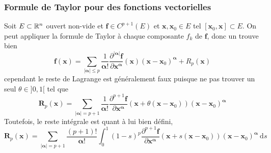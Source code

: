 \subsubsection{Formule de Taylor pour des fonctions vectorielles}
Soit $E \subset \mathbb R^n$ ouvert non-vide et $\bm f \in C^{p+1}(E)$ et $\bm x, \bm x_0 \in E$ tel $[\bm x_0, \bm x] \subset E$. On peut appliquer la formule de Taylor à chaque composante $f_k$ de $\bm f$, donc un trouve bien
\[
\bm f(\bm x) = \sum_{|\bm \alpha| \leqslant p} \frac{1}{\bm \alpha !} \frac{\partial^{|\bm \alpha|} \bm f}{\partial \bm x^{\bm \alpha}}(\bm x) (\bm x - \bm x_0)^{\bm \alpha} + R_p(\bm x)
\]
cependant le reste de Lagrange est généralement faux puisque ne pas trouver un seul $\theta \in ]0,1[$ tel que
\[
\bm R_p(\bm x) = \sum_{|\bm \alpha| = p + 1} \frac{1}{\bm \alpha !} \frac{\partial^{p+1} \bm f}{\partial \bm x^{\bm \alpha}} (\bm x + \theta (\bm x - \bm x_0))(\bm x - \bm x_0)^{\bm \alpha}
\]
Toutefois, le reste intégrale est quant à lui bien défini,
\[
\bm R_p(\bm x) = \sum_{|\bm \alpha| = p + 1} \frac{(p+1)!}{\bm \alpha!} \int_0^1 (1-s)^p \frac{\partial^{p+1} \bm f}{\partial \bm x^{\bm \alpha}} (\bm x + s (\bm x - \bm x_0))(\bm x - \bm x_0)^{\bm \alpha} ~\mathrm ds
\]